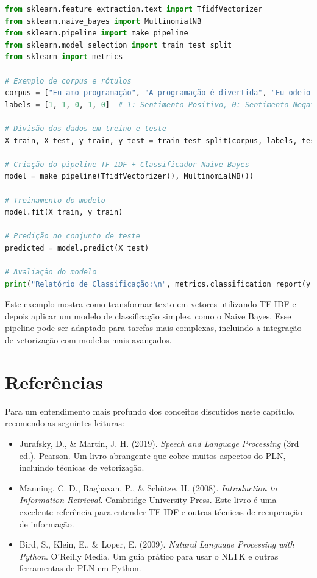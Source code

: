 \documentclass[14pt,a4paper,oneside]{book}
\begin{document}
\begin{lstlisting}[language=Python]
from sklearn.feature_extraction.text import TfidfVectorizer
from sklearn.naive_bayes import MultinomialNB
from sklearn.pipeline import make_pipeline
from sklearn.model_selection import train_test_split
from sklearn import metrics

# Exemplo de corpus e rótulos
corpus = ["Eu amo programação", "A programação é divertida", "Eu odeio bugs", "A vida é bela", "Eu odeio erros"]
labels = [1, 1, 0, 1, 0]  # 1: Sentimento Positivo, 0: Sentimento Negativo

# Divisão dos dados em treino e teste
X_train, X_test, y_train, y_test = train_test_split(corpus, labels, test_size=0.4, random_state=42)

# Criação do pipeline TF-IDF + Classificador Naive Bayes
model = make_pipeline(TfidfVectorizer(), MultinomialNB())

# Treinamento do modelo
model.fit(X_train, y_train)

# Predição no conjunto de teste
predicted = model.predict(X_test)

# Avaliação do modelo
print("Relatório de Classificação:\n", metrics.classification_report(y_test, predicted))
\end{lstlisting}

Este exemplo mostra como transformar texto em vetores utilizando TF-IDF e depois aplicar um modelo de classificação simples, como o Naive Bayes. Esse pipeline pode ser adaptado para tarefas mais complexas, incluindo a integração de vetorização com modelos mais avançados.

\section{Referências}
Para um entendimento mais profundo dos conceitos discutidos neste capítulo, recomendo as seguintes leituras:

\begin{itemize}
	\item Jurafsky, D., \& Martin, J. H. (2019). \textit{Speech and Language Processing} (3rd ed.). Pearson. Um livro abrangente que cobre muitos aspectos do PLN, incluindo técnicas de vetorização.
	\item Manning, C. D., Raghavan, P., \& Schütze, H. (2008). \textit{Introduction to Information Retrieval}. Cambridge University Press. Este livro é uma excelente referência para entender TF-IDF e outras técnicas de recuperação de informação.
	\item Bird, S., Klein, E., \& Loper, E. (2009). \textit{Natural Language Processing with Python}. O'Reilly Media. Um guia prático para usar o NLTK e outras ferramentas de PLN em Python.
\end{itemize}
\end{document}

